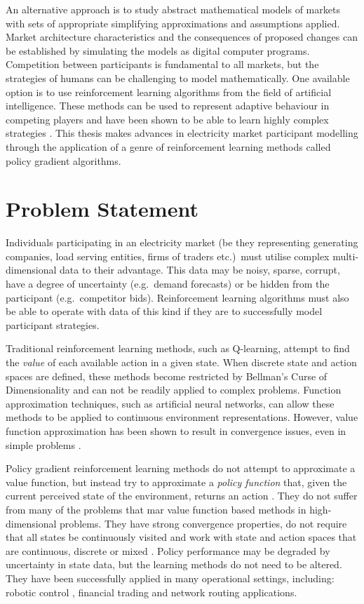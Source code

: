 An alternative approach is to study abstract mathematical models of markets with
sets of appropriate simplifying approximations and assumptions applied. Market
architecture characteristics and the consequences of proposed changes can be
established by simulating the models as digital computer programs. Competition
between participants is fundamental to all markets, but the strategies of humans
can be challenging to model mathematically. One available option is to use
reinforcement learning algorithms from the field of artificial intelligence.
These methods can be used to represent adaptive behaviour in competing players
and have been shown to be able to learn highly complex strategies
\cite{tesauro:gammon}.  This thesis makes advances in electricity market
participant modelling through the application of a genre of reinforcement
learning methods called policy gradient algorithms.

\section{Problem Statement}%
Individuals participating in an electricity market (be they representing
generating companies, load serving entities, firms of traders etc.)~must utilise
complex multi-dimensional data to their advantage. This data may be noisy,
sparse, corrupt, have a degree of uncertainty (e.g.~demand forecasts) or be
hidden from the participant (e.g.~competitor bids).  Reinforcement learning
algorithms must also be able to operate with data of this kind if they are to
successfully model participant strategies.

Traditional reinforcement learning methods, such as Q-learning, attempt to find
the \textit{value} of each available action in a given state.  When discrete
state and action spaces are defined, these methods become restricted by
Bellman's Curse of Dimensionality \cite{bellman:1961} and can not be readily
applied to complex problems.  Function approximation techniques, such as
artificial neural networks, can allow these methods to be applied to continuous
environment representations. However, value function approximation has been
shown to result in convergence issues, even in simple problems
\cite{tsitsiklis:94,peters:enac,gordon:95,baird:95}.

Policy gradient reinforcement learning methods do not attempt to approximate a
value function, but instead try to approximate a \textit{policy function} that,
given the current perceived state of the environment, returns an action
\cite{petersScholar}. They do not suffer from many of the problems that mar
value function based methods in high-dimensional problems.  They have strong
convergence properties, do not require that all states be continuously visited
and work with state and action spaces that are continuous, discrete or mixed
\cite{peters:enac}.  Policy performance may be degraded by uncertainty in state
data, but the learning methods do not need to be altered. They have been
successfully applied in many operational settings, including: robotic control
\cite{shaal:robots}, financial trading \cite{moody:direct} and network routing
\cite{peshkin:routing} applications.

